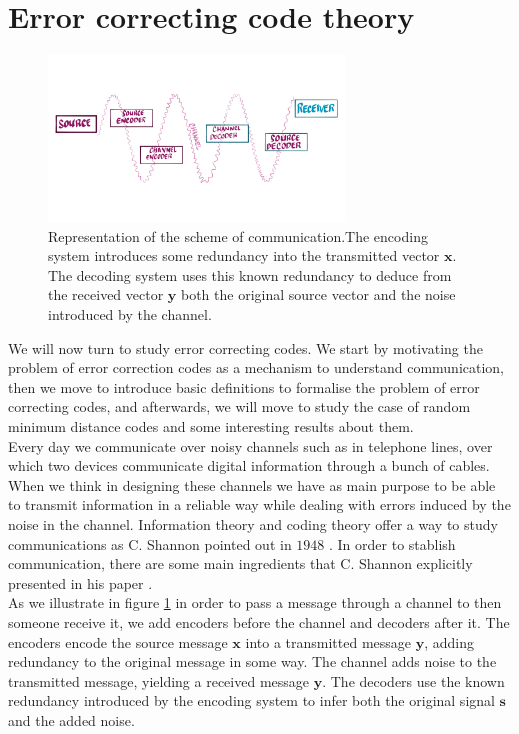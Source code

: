 \section{Error correcting code theory}
\begin{figure}[H]
\centering
\includegraphics[width=0.7\textwidth]{Figures/Source_Destination.png}
\caption{Representation of the scheme of communication.The encoding system introduces some redundancy into the transmitted vector $\mathbf{x}$. The decoding system uses this known redundancy to deduce from the received vector $\mathbf{y}$ both the original source vector and the noise introduced by the channel.}
\label{CH2:Channel_communication}
\end{figure}
We will now turn to study error correcting codes. We start by motivating the problem of error correction codes as a mechanism to understand communication, then we move to introduce basic definitions to formalise the problem of error correcting codes, and afterwards, we will move to study the case of random minimum distance codes and some interesting results about them.\\

\indent Every day we communicate over noisy channels such as in telephone lines, over which two devices communicate digital information through a bunch of cables. When we think in designing these channels we have as main purpose to be able to transmit information in a reliable way while dealing with  errors induced by the noise in the channel. Information theory and coding theory offer a way to study communications as C. Shannon pointed out in $1948$ \cite{shannon_mathematical_1948}. In order to stablish communication, there are some main ingredients that C. Shannon explicitly presented in his paper \cite{shannon_mathematical_1948}.\\
\indent As we illustrate in figure \ref{CH2:Channel_communication} in order to pass a message through a channel to then someone receive it, we add encoders before the channel and decoders after it. The encoders encode the source message $\mathbf{x}$ into a transmitted message $\mathbf{y}$, adding redundancy to the original message in some way. The channel adds noise to the transmitted message, yielding a received message $\mathbf{y}$. The decoders use the known redundancy introduced by the encoding system to infer both the original signal $\mathbf{s}$ and the added noise.
